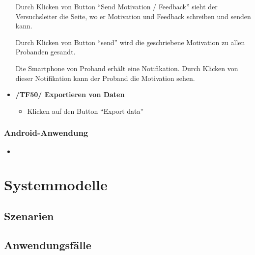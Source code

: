 \documentclass[a4paper]{scrreprt}
\begin{document}
\begin{itemize}
                    \par Durch Klicken von Button ``Send Motivation / Feedback'' sieht der Versuchsleiter die Seite, wo er Motivation und Feedback schreiben und senden kann.
                    \par Durch Klicken von Button ``send'' wird die geschriebene Motivation zu allen Probanden gesandt.
                    \par Die Smartphone von Proband erh\"alt eine Notifikation. Durch Klicken von dieser Notifikation kann der Proband die Motivation sehen.

                \item \textbf{/TF50/ Exportieren von Daten}
	                \begin{itemize}
	                	\item Klicken auf den Button ``Export data''
	                \end{itemize}


            \end{itemize}


        \vspace*{2cm}
        \subsection{Android-Anwendung}

            \begin{itemize}
                \item
            \end{itemize}

    \chapter{Systemmodelle}

        \section{Szenarien}

        \section{Anwendungsf\"alle}

            \newpage
\end{document}
